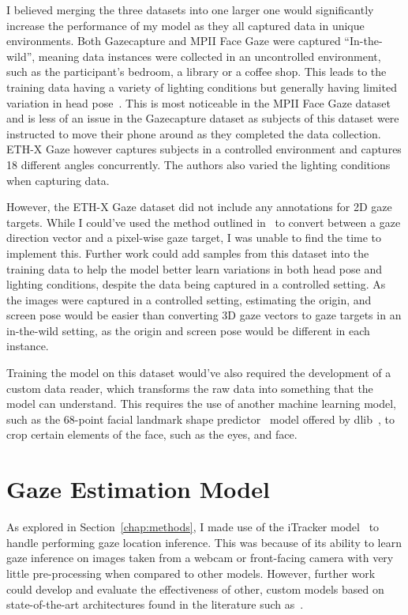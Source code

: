 \documentclass[twocolumn]{report}
\begin{document}
I believed merging the three datasets into one larger one would significantly increase the performance of my model as they all captured data in unique environments. Both Gazecapture and MPII Face Gaze were captured ``In-the-wild'', meaning data instances were collected in an uncontrolled environment, such as the participant's bedroom, a library or a coffee shop. This leads to the training data having a variety of lighting conditions but generally having limited variation in head pose~\cite{cheng2021survey}. This is most noticeable in the MPII Face Gaze dataset and is less of an issue in the Gazecapture dataset as subjects of this dataset were instructed to move their phone around as they completed the data collection. ETH-X Gaze however captures subjects in a controlled environment and captures 18 different angles concurrently. The authors also varied the lighting conditions when capturing data.

However, the ETH-X Gaze dataset did not include any annotations for 2D gaze targets. While I could've used the method outlined in~\cite{zhang15cvpr} to convert between a gaze direction vector and a pixel-wise gaze target, I was unable to find the time to implement this. Further work could add samples from this dataset into the training data to help the model better learn variations in both head pose and lighting conditions, despite the data being captured in a controlled setting. As the images were captured in a controlled setting, estimating the origin, and screen pose would be easier than converting 3D gaze vectors to gaze targets in an in-the-wild setting, as the origin and screen pose would be different in each instance. 

Training the model on this dataset would've also required the development of a custom data reader, which transforms the raw data into something that the model can understand. This requires the use of another machine learning model, such as the 68-point facial landmark shape predictor~\cite{king2015models} model offered by dlib~\cite{king2009dlib}, to crop certain elements of the face, such as the eyes, and face. 

\section{Gaze Estimation Model}

As explored in Section~\ref{chap:methods}, I made use of the iTracker model~\cite{krafka2016eye} to handle performing gaze location inference. This was because of its ability to learn gaze inference on images taken from a webcam or front-facing camera with very little pre-processing when compared to other models. However, further work could develop and evaluate the effectiveness of other, custom models based on state-of-the-art architectures found in the literature such as~\cite{seonwook2019fewshot,tafasca2023sharingan}. 
\end{document}
